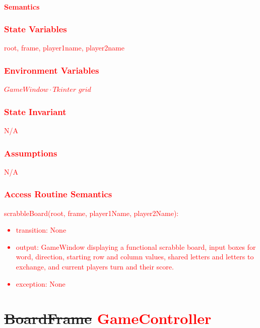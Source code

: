 \documentclass[12pt]{article}
\begin{document}
\paragraph* {\textcolor{red}{Semantics}}

\subsubsection*{\textcolor{red}{State Variables}}

\textcolor{red}{root, frame, player1name, player2name}

\subsubsection*{\textcolor{red}{Environment Variables}}

\textcolor{red}{$GameWindow \cdot Tkinter$  $grid$}

\subsubsection*{\textcolor{red}{State Invariant}}

\textcolor{red}{N/A}

\subsubsection*{\textcolor{red}{Assumptions}}

\textcolor{red}{N/A}

\subsubsection* {\textcolor{red}{Access Routine Semantics}}

\textcolor{red}{\noindent scrabbleBoard(root, frame, player1Name, player2Name):
\begin{itemize}
\item transition: None
\item output: \textcolor{red}{GameWindow} displaying a functional scrabble board, input boxes for word, direction, starting row and column values, shared letters and letters to exchange,  and  current players turn and their score.
\item exception: None
\end{itemize}
}

\section*{\sout{BoardFrame} \textcolor{red}{GameController}}
\end{document}
